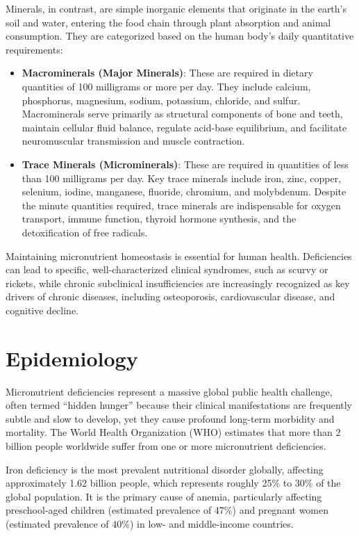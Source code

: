 Minerals, in contrast, are simple inorganic elements that originate in the earth's soil and water, entering the food chain through plant absorption and animal consumption. They are categorized based on the human body's daily quantitative requirements:
\begin{itemize}
\item \textbf{Macrominerals (Major Minerals)}: These are required in dietary quantities of 100 milligrams or more per day. They include calcium, phosphorus, magnesium, sodium, potassium, chloride, and sulfur. Macrominerals serve primarily as structural components of bone and teeth, maintain cellular fluid balance, regulate acid-base equilibrium, and facilitate neuromuscular transmission and muscle contraction.
\item \textbf{Trace Minerals (Microminerals)}: These are required in quantities of less than 100 milligrams per day. Key trace minerals include iron, zinc, copper, selenium, iodine, manganese, fluoride, chromium, and molybdenum. Despite the minute quantities required, trace minerals are indispensable for oxygen transport, immune function, thyroid hormone synthesis, and the detoxification of free radicals.
\end{itemize}

Maintaining micronutrient homeostasis is essential for human health. Deficiencies can lead to specific, well-characterized clinical syndromes, such as scurvy or rickets, while chronic subclinical insufficiencies are increasingly recognized as key drivers of chronic diseases, including osteoporosis, cardiovascular disease, and cognitive decline.

\section*{Epidemiology}
Micronutrient deficiencies represent a massive global public health challenge, often termed ``hidden hunger'' because their clinical manifestations are frequently subtle and slow to develop, yet they cause profound long-term morbidity and mortality. The World Health Organization (WHO) estimates that more than 2 billion people worldwide suffer from one or more micronutrient deficiencies.

Iron deficiency is the most prevalent nutritional disorder globally, affecting approximately 1.62 billion people, which represents roughly 25\% to 30\% of the global population. It is the primary cause of anemia, particularly affecting preschool-aged children (estimated prevalence of 47\%) and pregnant women (estimated prevalence of 40\%) in low- and middle-income countries.

